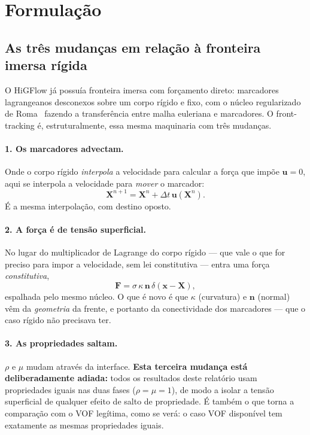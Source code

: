 \section{Formula\c{c}\~ao}

\subsection{As tr\^es mudan\c{c}as em rela\c{c}\~ao \`a fronteira imersa r\'igida}

O HiGFlow j\'a possu\'ia fronteira imersa com for\c{c}amento direto: marcadores
lagrangeanos desconexos sobre um corpo r\'igido e fixo, com o n\'ucleo
regularizado de Roma~\cite{roma1999} fazendo a transfer\^encia entre malha
euleriana e marcadores. O front-tracking \'e, estruturalmente, essa mesma
maquinaria com tr\^es mudan\c{c}as.

\paragraph{1. Os marcadores advectam.} Onde o corpo r\'igido \emph{interpola} a
velocidade para calcular a for\c{c}a que imp\~oe $\mathbf{u}=0$, aqui se interpola
a velocidade para \emph{mover} o marcador:
\begin{equation}
  \mathbf{X}^{n+1} = \mathbf{X}^{n} + \Delta t\, \mathbf{u}(\mathbf{X}^{n}).
\end{equation}
\'E a mesma interpola\c{c}\~ao, com destino oposto.

\paragraph{2. A for\c{c}a \'e de tens\~ao superficial.} No lugar do multiplicador
de Lagrange do corpo r\'igido --- que vale o que for preciso para impor a
velocidade, sem lei constitutiva --- entra uma for\c{c}a \emph{constitutiva},
\begin{equation}
  \mathbf{F} = \sigma\,\kappa\,\mathbf{n}\,\delta(\mathbf{x}-\mathbf{X}),
  \label{eq:tensao}
\end{equation}
espalhada pelo mesmo n\'ucleo. O que \'e novo \'e que $\kappa$ (curvatura) e
$\mathbf{n}$ (normal) v\^em da \emph{geometria} da frente, e portanto da
conectividade dos marcadores --- que o caso r\'igido n\~ao precisava ter.

\paragraph{3. As propriedades saltam.} $\rho$ e $\mu$ mudam atrav\'es da
interface. \textbf{Esta terceira mudan\c{c}a est\'a deliberadamente adiada:} todos
os resultados deste relat\'orio usam propriedades iguais nas duas fases
($\rho=\mu=1$), de modo a isolar a tens\~ao superficial de qualquer efeito de
salto de propriedade. \'E tamb\'em o que torna a compara\c{c}\~ao com o VOF
leg\'itima, como se ver\'a: o caso VOF dispon\'ivel tem exatamente as mesmas
propriedades iguais.

